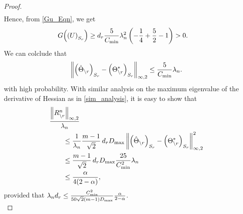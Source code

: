 \begin{proof}
\begin{equation}
\begin{aligned}
\end{aligned}
\nonumber
\end{equation}
Hence, from \eqref{Gu_Eqn}, we get
\begin{equation}
\begin{aligned}
G\Big(\!\left(U\right)_{S_{r}}\!\Big) &\geq d_{r} \frac{5}{C_{\min}} \lambda_n^2 \left(-\frac{1}{4}+\frac{5}{2}-1\right) > 0.
\end{aligned}
\nonumber
\end{equation}
We can colclude that
\begin{equation}
\left\|\left(\hat{\Theta}_{\backslash r}\right)_{S_{r}} -\left(\Theta^*_{\backslash r}\right)_{S_{r}}\right\|_{\infty,2}\leq \frac{5}{C_{\min}}\lambda_n.
\label{L_inf_2_bound}
\end{equation}
with high probability. With similar analysis on the maximum eigenvalue of the derivative of Hessian as in \eqref{sim_analysis}, it is easy to show that
\begin{equation}
\begin{aligned}
&\frac{\left\|R^n_{\backslash r}\right\|_{\infty,2}}{\lambda_n}\\ &\qquad\leq \frac{1}{\lambda_n} \frac{m-1}{\sqrt{2}}\, d_{r} D_{\max} \left\|\left(\hat{\Theta}_{\backslash r}\right)_{S_{r}} -\left(\Theta^*_{\backslash r}\right)_{S_{r}}\right\|_{\infty,2}^2\\
&\qquad\leq \frac{m-1}{\sqrt{2}} \, d_{r} D_{\max} \frac{25}{C_{\min}^2} \lambda_n\\
&\qquad\leq\frac{\alpha}{4(2-\alpha)},
\end{aligned}
\nonumber
\end{equation}
provided that $\lambda_n d_{r}\leq\frac{C_{\min}^2}{50\sqrt{2}(m-1)D_{\max}}\frac{\alpha}{2-\alpha}$.\\
\end{proof}

